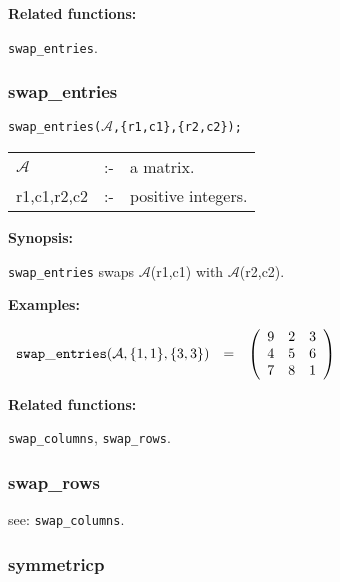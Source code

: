 {\bf Related functions:}

\hspace*{0.175in} {\tt swap\_entries}.


\subsubsection{swap\_entries}
\label{linalg:swap_entries}

\hspace*{0.175in} {\tt swap\_entries($\mathcal{A}$,\{r1,c1\},\{r2,c2\});}

\hspace*{0.1in}  
\begin{tabular}{l l l} 
$\mathcal{A}$  &:-& a matrix. \\
r1,c1,r2,c2 &:-& positive integers.
\end{tabular}

{\bf Synopsis:} %

\hspace*{0.175in} {\tt swap\_entries} swaps $\mathcal{A}$(r1,c1) with 
                $\mathcal{A}$(r2,c2).

{\bf Examples:}

\begin{flushleft}  
\hspace*{0.1in}
\begin{math}  
\begin{array}{ccc}
{\tt swap\_entries}(\mathcal{A},\{1,1\},\{3,3\}) & = & 
        \left( \begin{array}{ccc} 9 & 2 & 3 \\ 4 & 5 & 6 \\ 7 & 8 & 1
 \end{array} \right) 
\end{array}
\end{math}  
\end{flushleft}

{\bf Related functions:}

\hspace*{0.175in} {\tt swap\_columns}, {\tt swap\_rows}.


\subsubsection{swap\_rows}
\label{linalg:swap_rows}
\hspace*{0.175in} see: {\tt swap\_columns}.


\subsubsection{symmetricp}
\label{linalg:symmetricp}

